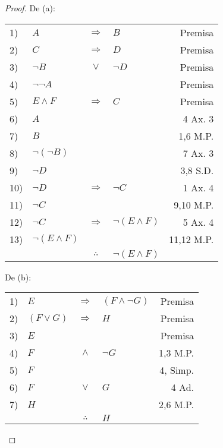\documentclass[12pt]{report}
\theoremstyle{largebreak}
\begin{document}
    \begin{proof}
        De (a):
        \begin{center}
            \begin{tabular}{l l c l r}
                1) & $A$ & $\Rightarrow$ & $B$ & Premisa \\
                2) & $C$ & $\Rightarrow$ & $D$ & Premisa \\
                3) & $\neg B$ & $\lor$ & $\neg D$ & Premisa \\
                4) & $\neg\neg A$ &  &  & Premisa \\
                5) & $E\land F$ & $\Rightarrow$ & $C$ & Premisa \\
                6) & $A$ &  &  & 4 Ax. 3 \\
                7) & $B$ &  &  & 1,6 M.P. \\
                8) & $\neg(\neg B)$ &  &  & 7 Ax. 3 \\
                9) & $\neg D$ &  &  & 3,8 S.D.\\
                10) & $\neg D$ & $\Rightarrow$ & $\neg C$ & 1 Ax. 4 \\
                11) & $\neg C$ &  &  & 9,10 M.P.\\
                12) & $\neg C$ & $\Rightarrow$ & $\neg(E\land F)$ & 5 Ax. 4 \\
                13) & $\neg(E\land F)$ &  &  & 11,12 M.P.\\
                \hline
                & & $\therefore$ & $\neg (E\land F)$ & \\
            \end{tabular}
        \end{center}

        De (b):
        \begin{center}
            \begin{tabular}{l l c l r}
                1) & $E$ & $\Rightarrow$ & $(F\land\neg G)$ & Premisa \\
                2) & $(F\lor G)$ & $\Rightarrow$ & $H$ & Premisa \\
                3) & $E$ &  &  & Premisa \\
                4) & $F$ & $\land$ & $\neg G$ & 1,3 M.P. \\
                5) & $F$ &  &  & 4, Simp. \\
                6) & $F$ & $\lor$ & $G$ & 4 Ad. \\
                7) & $H$ &  &  & 2,6 M.P. \\
                \hline
                & & $\therefore$ & $H$ & \\
            \end{tabular}
        \end{center}
    \end{proof}
\end{document}
